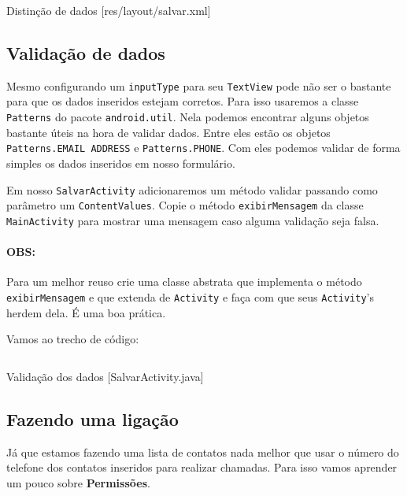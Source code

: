 \begin{listing}[H]
  \inputminted[linenos=true,frame=bottomline,tabsize=3]{ xml }{ source/salvar-2.xml }
  \caption{Distinção de dados [res/layout/salvar.xml]}
\end{listing}

\subsection{Validação de dados}

Mesmo configurando um \texttt{inputType} para seu \texttt{TextView} pode
não ser o bastante para que os dados inseridos estejam corretos. Para
isso usaremos a classe \texttt{Patterns} do pacote
\texttt{android.util}. Nela podemos encontrar alguns objetos bastante
úteis na hora de validar dados. Entre eles estão os objetos
\texttt{Patterns.EMAIL ADDRESS} e \texttt{Patterns.PHONE}. Com eles
podemos validar de forma simples os dados inseridos em nosso formulário.

Em nosso \texttt{SalvarActivity} adicionaremos um método validar
passando como parâmetro um \texttt{ContentValues}. Copie o método
\texttt{exibirMensagem} da classe \texttt{MainActivity} para mostrar uma
mensagem caso alguma validação seja falsa.

\paragraph{OBS:}

Para um melhor reuso crie uma classe abstrata que implementa o método
\texttt{exibirMensagem} e que extenda de \texttt{Activity} e faça com
que seus \texttt{Activity}'s herdem dela. É uma boa prática.

Vamos ao trecho de código:

\begin{listing}[H]
  \inputminted[linenos=true,frame=bottomline,tabsize=3]{ java }{ source/SalvarActivity-4.java }
  \caption{Validação dos dados [SalvarActivity.java]}
\end{listing}

\subsection{Fazendo uma ligação}

Já que estamos fazendo uma lista de contatos nada melhor que usar o
número do telefone dos contatos inseridos para realizar chamadas. Para
isso vamos aprender um pouco sobre \textbf{Permissões}.

